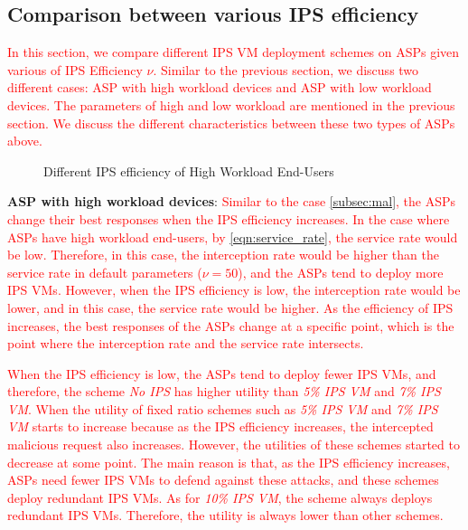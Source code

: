 \documentclass[10pt,journal, compsoc]{IEEEtran}
\begin{document}
\subsection{Comparison between various IPS efficiency}
\textcolor{red}{In this section, we compare different IPS VM deployment schemes on ASPs given various of IPS Efficiency $\nu$. Similar to the previous section, we discuss two different cases: ASP with high workload devices and ASP with low workload devices. The parameters of high and low workload are mentioned in the previous section. We discuss the different characteristics between these two types of ASPs above. }


\begin{figure}[!]
\captionsetup{justification=centering}
  \hfill
  \hfill
\label{fig:eff_high}
\caption{Different IPS efficiency of High Workload End-Users}
\end{figure}
\textbf{ASP with high workload devices}:
\textcolor{red}{
Similar to the case \cref{subsec:mal}, the ASPs change their best responses when the IPS efficiency increases. In the case where ASPs have high workload end-users, by \cref{eqn:service_rate}, the service rate would be low. Therefore, in this case, the interception rate would be higher than the service rate in default parameters ($\nu = 50$), and the ASPs tend to deploy more IPS VMs. However, when the IPS efficiency is low, the interception rate would be lower, and in this case, the service rate would be higher. As the efficiency of IPS increases, the best responses of the ASPs change at a specific point, which is the point where the interception rate and the service rate intersects.}

\textcolor{red}{
When the IPS efficiency is low, the ASPs tend to deploy fewer IPS VMs, and therefore, the scheme \textit{No IPS} has higher utility than \textit{5\% IPS VM} and \textit{7\% IPS VM}. When the utility of fixed ratio schemes such as \textit{5\% IPS VM} and \textit{7\% IPS VM} starts to increase because as the IPS efficiency increases, the intercepted malicious request also increases. However, the utilities of these schemes started to decrease at some point. The main reason is that, as the IPS efficiency increases, ASPs need fewer IPS VMs to defend against these attacks, and these schemes deploy redundant IPS VMs. As for \textit{10\% IPS VM}, the scheme always deploys redundant IPS VMs. Therefore, the utility is always lower than other schemes.}
\end{document}
